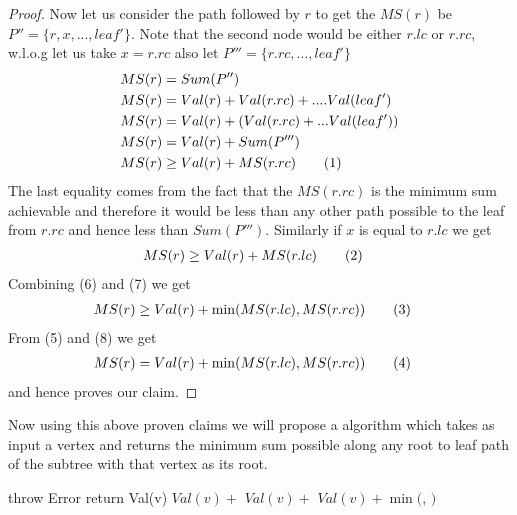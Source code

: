 \documentclass[answers]{exam}
\newcommand\numberthis{\addtocounter{equation}{1}\tag{\theequation}}
\begin{document}
\begin{questions}
\begin{solution}
\begin{proof}
Now let us consider the path followed by $r$ to get the $MS(r)$ be $P''=\{r,x,...,leaf'\}$. Note that the second node would be either $r.lc$ or $r.rc$, w.l.o.g let us take $x=r.rc$ also let $P'''=\{r.rc,\ldots,leaf'\}$
\begin{align*}
    MS(r)&=Sum(P'')\\
    MS(r)&=Val(r)+Val(r.rc)+....Val(leaf')\\
    MS(r)&=Val(r)+(Val(r.rc)+...Val(leaf'))\\
    MS(r)&=Val(r)+Sum(P''')\\
    MS(r)&\geq Val(r)+MS(r.rc) \numberthis \label{eqn}
\end{align*}
The last equality comes from the  fact that the $MS(r.rc)$ is the minimum sum achievable and therefore it would be less than any other path possible to the leaf from $r.rc$ and hence less than $Sum(P''')$. 
\newline Similarly if $x$ is equal to $r.lc$ we get
\begin{align*}
    MS(r)&\geq Val(r)+MS(r.lc) \numberthis \label{eqn}
\end{align*}
Combining (6) and (7) we get 
\begin{align*}
     MS(r)&\geq Val(r)+\min(MS(r.lc),MS(r.rc))  \numberthis \label{eqn}
\end{align*}
From (5) and (8) we get
\begin{align*}
   MS(r)&= Val(r)+\min(MS(r.lc),MS(r.rc))  \numberthis \label{eqn}
\end{align*}
and hence proves our claim.
\end{proof}

Now using this above proven claims we will propose a algorithm which takes as input a vertex and returns the minimum sum possible along any root to leaf path of the subtree with that vertex as its root.

\begin{algorithmic}[1]
        \State throw Error
    \EndIf
        \State return Val(v)
    \EndIf
        \State \Return $Val(v)+$
    \EndIf
        \State \Return $Val(v)+$
    \EndIf
    \State \Return $Val(v) + \min( $, $)$


\end{algorithmic}
\end{solution}
\end{questions}
\end{document}
